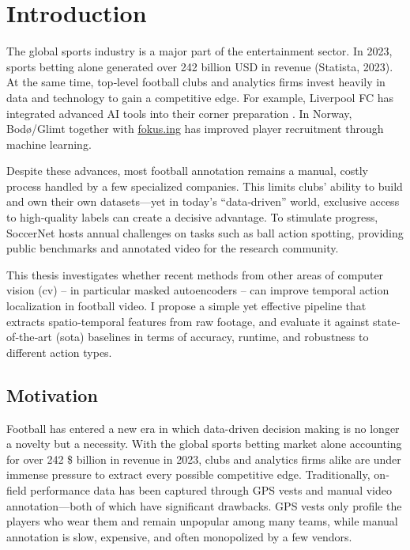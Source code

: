 \chapter{Introduction}
\label{chap:intro}

The global sports industry is a major part of the entertainment sector. In 2023, sports betting alone generated over 242 billion USD in revenue (Statista, 2023). At the same time, top‐level football clubs and analytics firms invest heavily in data and technology to gain a competitive edge. For example, Liverpool FC has integrated advanced AI tools into their corner preparation \cite{wang_tactic_ai_2024}. In Norway, Bodø/Glimt together with \hyperlink{https://fokus.ing}{fokus.ing} has improved player recruitment through machine learning.

Despite these advances, most football annotation remains a manual, costly process handled by a few specialized companies. This limits clubs’ ability to build and own their own datasets—yet in today’s “data‐driven” world, exclusive access to high‐quality labels can create a decisive advantage. To stimulate progress, SoccerNet hosts annual challenges on tasks such as ball action spotting, providing public benchmarks and annotated video for the research community.

This thesis investigates whether recent methods from other areas of computer vision (\acrlong{cv}) – in particular masked autoencoders – can improve temporal action localization in football video. I propose a simple yet effective pipeline that extracts spatio‐temporal features from raw footage, and evaluate it against state‐of‐the‐art (\acrfull{sota}) baselines in terms of accuracy, runtime, and robustness to different action types.

\section{Motivation}
Football has entered a new era in which data-driven decision making is no longer a novelty but a necessity. With the global sports betting market alone accounting for over 242 \$ billion in revenue in 2023, clubs and analytics firms alike are under immense pressure to extract every possible competitive edge. Traditionally, on‐field performance data has been captured through GPS vests and manual video annotation—both of which have significant drawbacks. GPS vests only profile the players who wear them and remain unpopular among many teams, while manual annotation is slow, expensive, and often monopolized by a few vendors.  

